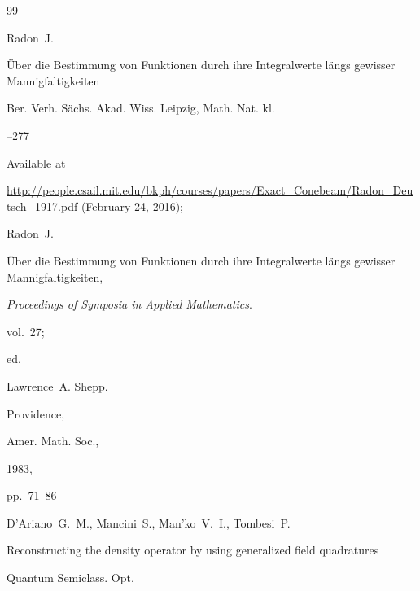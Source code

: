 \begin{thebibliography}{99}




\by  Radon~J.

\paper \"Uber die Bestimmung von Funktionen durch ihre Integralwerte l\"angs gewisser Mannigfaltigkeiten

 \jour Ber. Verh. S\"achs. Akad. Wiss. Leipzig, Math. Nat. kl.



--277

\elink Available at 

 \url{http://people.csail.mit.edu/bkph/courses/papers/Exact_Conebeam/Radon_Deutsch_1917.pdf}    (February 24, 2016);



Radon~J. 


\"Uber die Bestimmung von Funktionen durch ihre Integralwerte l\"angs gewisser Mannigfaltigkeiten,


{\it Proceedings of Symposia in Applied Mathematics}.


vol.~27;


ed.

Lawrence~A. Shepp.


Providence,


Amer. Math. Soc.,


1983,


pp.~71--86







\by   D'Ariano~G.~M., Mancini~S., Man'ko~V.~I., Tombesi~P.

\paper Reconstructing the density operator by using generalized field quadratures

 \jour Quantum Semiclass. Opt. 




\end{thebibliography}
